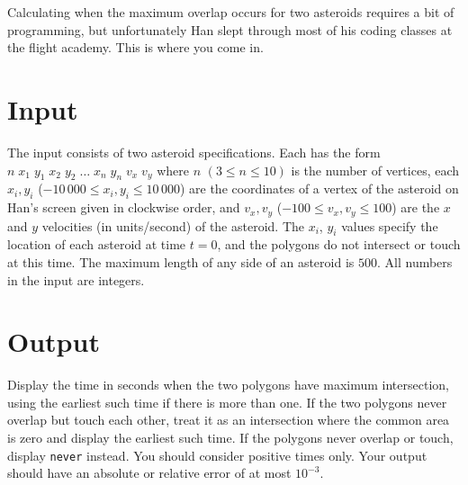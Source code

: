 Calculating when the maximum overlap occurs for two asteroids requires a bit of programming, but unfortunately Han slept through most of his coding classes at the flight academy.  This is where you come in.


\section*{Input}
The input consists of two asteroid specifications. Each has the form $n\;x_{1}\;y_{1}\;x_{2}\;y_{2}\;\ldots\;x_{n}\;y_{n}\;v_{x}\;v_{y}$ where $n$ $(3 \le n \le 10)$ is the number of vertices, each $x_{i}, y_{i}$ ($-10\,000 \le x_{i}, y_{i} \le 10\,000$) are the coordinates of a vertex of the asteroid on Han's screen given in clockwise order, and $v_{x}, v_{y}$ ($-100 \le v_{x}, v_{y} \le 100$) are the $x$ and $y$ velocities (in units/second) of the asteroid. The $x_{i}$, $y_{i}$ values specify the location of each asteroid at time $t=0$, and the polygons do not intersect or touch at this time. The maximum length of any side of an asteroid is $500$. All numbers in the input are integers.


\section*{Output}

Display the time in seconds when the two polygons have maximum intersection, using the earliest such time if there is more than one. If the two polygons never overlap but touch each other, treat it as an intersection where the common area is zero and display the earliest such time. If the polygons never overlap or touch, display \texttt{never} instead.  You should consider positive times only. Your output should have an absolute or relative error of at most $10^{-3}$. 
